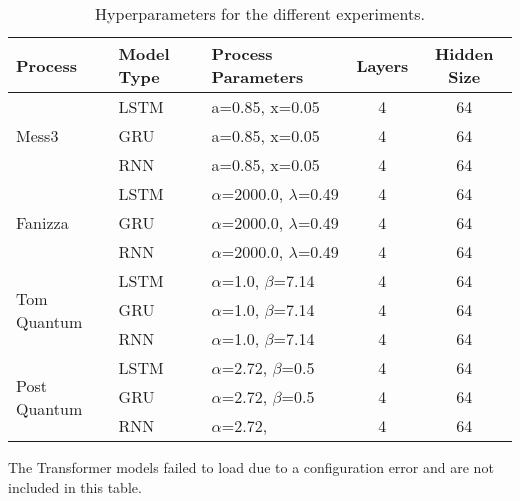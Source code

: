 \begin{table}[H]
\centering
\caption{Hyperparameters for the different experiments.}
\label{tab:hyperparams}
\begin{tabular}{l|l|l|c|c}
\toprule
\textbf{Process} & \textbf{Model Type} & \textbf{Process Parameters} & \textbf{Layers} & \textbf{Hidden Size} \\
\midrule
\multirow{3}{*}{Mess3} & LSTM & a=0.85, x=0.05 & 4 & 64 \\
& GRU & a=0.85, x=0.05 & 4 & 64 \\
& RNN & a=0.85, x=0.05 & 4 & 64 \\
\hline
\multirow{3}{*}{Fanizza} & LSTM & $\alpha$=2000.0, $\lambda$=0.49 & 4 & 64 \\
& GRU & $\alpha$=2000.0, $\lambda$=0.49 & 4 & 64 \\
& RNN & $\alpha$=2000.0, $\lambda$=0.49 & 4 & 64 \\
\hline
\multirow{3}{*}{Tom Quantum} & LSTM & $\alpha$=1.0, $\beta$=7.14 & 4 & 64 \\
& GRU & $\alpha$=1.0, $\beta$=7.14 & 4 & 64 \\
& RNN & $\alpha$=1.0, $\beta$=7.14 & 4 & 64 \\
\hline
\multirow{3}{*}{Post Quantum} & LSTM & $\alpha$=2.72, $\beta$=0.5 & 4 & 64 \\
& GRU & $\alpha$=2.72, $\beta$=0.5 & 4 & 64 \\
& RNN & $\alpha$=2.72, \beta=0.5 & 4 & 64 \\
\bottomrule
\end{tabular}
\end{table}

The Transformer models failed to load due to a configuration error and are not included in this table.